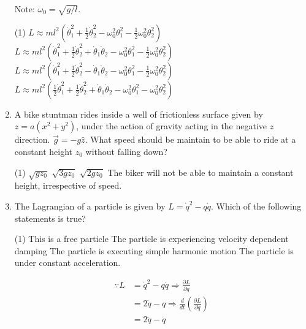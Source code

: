 \begin{enumerate}
	Note: $\omega_{0}=\sqrt{g / l}$.
	{}
	\begin{tasks}(1)
		\task[\textbf{A.}] $L \approx m l^{2}\left(\dot{\theta}_{1}^{2}+\frac{1}{2} \dot{\theta}_{2}^{2}-\omega_{0}^{2} \theta_{1}^{2}-\frac{1}{2} \omega_{0}^{2} \theta_{2}^{2}\right)$
		\task[\textbf{B.}]  $L \approx m l^{2}\left(\dot{\theta}_{1}^{2}+\frac{1}{2} \dot{\theta}_{2}^{2}+\dot{\theta}_{1} \dot{\theta}_{2}-\omega_{0}^{2} \theta_{1}^{2}-\frac{1}{2} \omega_{0}^{2} \theta_{2}^{2}\right)$
		\task[\textbf{C.}] $L \approx m l^{2}\left(\dot{\theta}_{1}^{2}+\frac{1}{2} \dot{\theta}_{2}^{2}-\dot{\theta}_{1} \dot{\theta}_{2}-\omega_{0}^{2} \theta_{1}^{2}-\frac{1}{2} \omega_{0}^{2} \theta_{2}^{2}\right)$
		\task[\textbf{D.}]  $L \approx m l^{2}\left(\frac{1}{2} \dot{\theta}_{1}^{2}+\frac{1}{2} \dot{\theta}_{2}^{2}+\dot{\theta}_{1} \dot{\theta}_{2}-\omega_{0}^{2} \theta_{1}^{2}-\omega_{0}^{2} \theta_{2}^{2}\right)$
	\end{tasks}
	\item A bike stuntman rides inside a well of frictionless surface given by $z=a\left(x^{2}+y^{2}\right)$, under the action of gravity acting in the negative $z$ direction. $\vec{g}=-g \hat{z} .$ What speed should be maintain to be able to ride at a constant height $z_{0}$ without falling down?
	{}
	\begin{tasks}(1)
		\task[\textbf{A.}] $\sqrt{g z_{0}}$
		\task[\textbf{B.}] $\sqrt{3 g z_{0}}$
		\task[\textbf{C.}] $\sqrt{2 g z_{0}}$
		\task[\textbf{D.}] The biker will not be able to maintain a constant height, irrespective of speed.
	\end{tasks}
	\item The Lagrangian of a particle is given by $L=\dot{q}^{2}-q \dot{q}$. Which of the following statements is true?
	{}
	\begin{tasks}(1)
		\task[\textbf{A.}]  This is a free particle
		\task[\textbf{B.}] The particle is experiencing velocity dependent damping
		\task[\textbf{C.}] The particle is executing simple harmonic motion
		\task[\textbf{D.}] The particle is under constant acceleration.
	\end{tasks}
	\begin{answer}
		\begin{align*}
		\because L&=\dot{q}^{2}-q \dot{q} \Rightarrow \frac{\partial L}{\partial \dot{q}}\\&=2 \dot{q}-q \Rightarrow \frac{d}{d t}\left(\frac{\partial L}{\partial \dot{q}}\right)\\&=2 \ddot{q}-\dot{q}\\

\end{align*}
\end{answer}
\end{enumerate}
